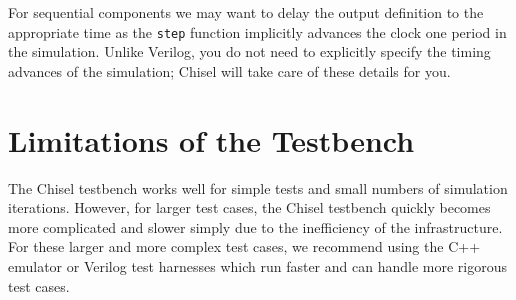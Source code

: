 \documentclass[twocolumn, 10pt]{article}
\begin{document}
For sequential components we may want to delay the output definition to the appropriate time as the \verb+step+ function implicitly advances the clock one period in the simulation. Unlike Verilog, you do not need to explicitly specify the timing advances of the simulation; Chisel will take care of these details for you.

\section{Limitations of the Testbench}

The Chisel testbench works well for simple tests and small numbers of simulation iterations. However, for larger test cases, the Chisel testbench quickly becomes more complicated and slower simply due to the inefficiency of the infrastructure. For these larger and more complex test cases, we recommend using the C++ emulator or Verilog test harnesses which run faster and can handle more rigorous test cases.
\end{document}
